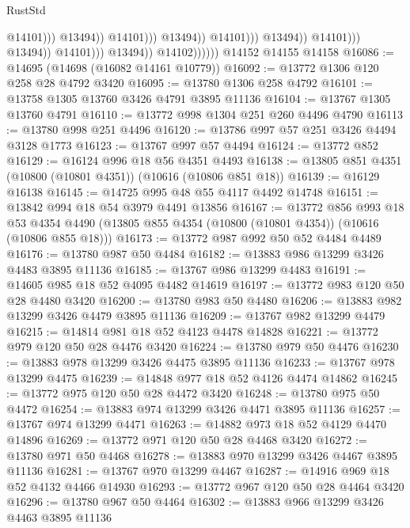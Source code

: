 \begin{lexlean}{RustStd}
\begin{coremodule}
                                                                  @14101)))
                                                            @13494))
                                                        @14101)))
                                                  @13494))
                                              @14101)))
                                        @13494))
                                    @14101)))
                              @13494))
                          @14101)))
                    @13494))
                @14102))))))
    @14152
    @14155
    @14158
@16086 := @14695 (@14698 (@16082 @14161 @10779))
@16092 := @13772 @1306 @120 @258 @28 @4792 @3420
@16095 := @13780 @1306 @258 @4792
@16101 := @13758 @1305 @13760 @3426 @4791 @3895 @11136
@16104 := @13767 @1305 @13760 @4791
@16110 := @13772 @998 @1304 @251 @260 @4496 @4790
@16113 := @13780 @998 @251 @4496
@16120 := @13786 @997 @57 @251 @3426 @4494 @3128 @1773
@16123 := @13767 @997 @57 @4494
@16124 := @13772 @852
@16129 := @16124 @996 @18 @56 @4351 @4493
@16138 := @13805 @851 @4351 (@10800 (@10801 @4351)) (@10616 (@10806 @851 @18))
@16139 := @16129 @16138
@16145 := @14725 @995 @48 @55 @4117 @4492 @14748
@16151 := @13842 @994 @18 @54 @3979 @4491 @13856
@16167 := @13772
    @856
    @993
    @18
    @53
    @4354
    @4490
    (@13805 @855 @4354 (@10800 (@10801 @4354)) (@10616 (@10806 @855 @18)))
@16173 := @13772 @987 @992 @50 @52 @4484 @4489
@16176 := @13780 @987 @50 @4484
@16182 := @13883 @986 @13299 @3426 @4483 @3895 @11136
@16185 := @13767 @986 @13299 @4483
@16191 := @14605 @985 @18 @52 @4095 @4482 @14619
@16197 := @13772 @983 @120 @50 @28 @4480 @3420
@16200 := @13780 @983 @50 @4480
@16206 := @13883 @982 @13299 @3426 @4479 @3895 @11136
@16209 := @13767 @982 @13299 @4479
@16215 := @14814 @981 @18 @52 @4123 @4478 @14828
@16221 := @13772 @979 @120 @50 @28 @4476 @3420
@16224 := @13780 @979 @50 @4476
@16230 := @13883 @978 @13299 @3426 @4475 @3895 @11136
@16233 := @13767 @978 @13299 @4475
@16239 := @14848 @977 @18 @52 @4126 @4474 @14862
@16245 := @13772 @975 @120 @50 @28 @4472 @3420
@16248 := @13780 @975 @50 @4472
@16254 := @13883 @974 @13299 @3426 @4471 @3895 @11136
@16257 := @13767 @974 @13299 @4471
@16263 := @14882 @973 @18 @52 @4129 @4470 @14896
@16269 := @13772 @971 @120 @50 @28 @4468 @3420
@16272 := @13780 @971 @50 @4468
@16278 := @13883 @970 @13299 @3426 @4467 @3895 @11136
@16281 := @13767 @970 @13299 @4467
@16287 := @14916 @969 @18 @52 @4132 @4466 @14930
@16293 := @13772 @967 @120 @50 @28 @4464 @3420
@16296 := @13780 @967 @50 @4464
@16302 := @13883 @966 @13299 @3426 @4463 @3895 @11136

\end{coremodule}
\end{lexlean}
